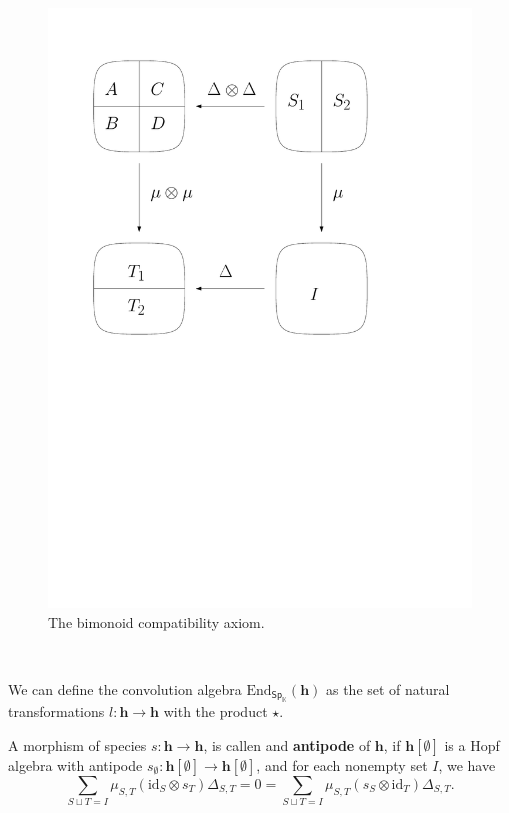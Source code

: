 \documentclass[12pt, reqno]{amsart}
\theoremstyle{definition}
\newcommand{\Ssk}{\mathsf{Sp}_\Kb} %
\newcommand{\Kb}{\mathbb{K}}
\newcommand{\thh}{\mathbf{h}}
\begin{document}
\begin{figure}
\includegraphics[scale=0.5]{images/diagram_bialgebra}
\caption{The bimonoid compatibility axiom.\label{fig:bimonoid}}
\end{figure}

\

We can define the convolution algebra $\text{End}_{\Ssk}(\thh)$ as the set of natural transformations $l: \thh \to \thh$ with the product $\star$.

A morphism of species $s: \thh \to \thh$, is callen and {\bf antipode} of $\thh$, if $\thh[\emptyset]$ is a Hopf algebra with antipode $s_\emptyset: \thh[\emptyset] \to \thh[\emptyset]$, and for each nonempty set $I$, we have
\begin{equation}
    \sum_{S \sqcup T = I} \mu_{S,T}(\text{id}_S \otimes s_T)\Delta_{S,T} = 0 = \sum_{S \sqcup T = I} \mu_{S,T}(s_S \otimes \text{id}_T)\Delta_{S,T}.
\end{equation}
\end{document}
